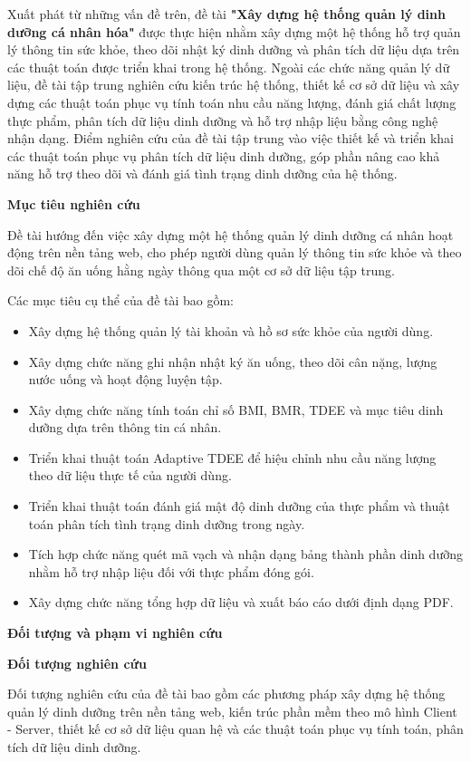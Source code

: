 \documentclass[12pt, a4paper]{report}
\begin{document}
Xuất phát từ những vấn đề trên, đề tài \textbf{"Xây dựng hệ thống quản lý dinh dưỡng cá nhân hóa"} được thực hiện nhằm xây dựng một hệ thống hỗ trợ quản lý thông tin sức khỏe, theo dõi nhật ký dinh dưỡng và phân tích dữ liệu dựa trên các thuật toán được triển khai trong hệ thống. Ngoài các chức năng quản lý dữ liệu, đề tài tập trung nghiên cứu kiến trúc hệ thống, thiết kế cơ sở dữ liệu và xây dựng các thuật toán phục vụ tính toán nhu cầu năng lượng, đánh giá chất lượng thực phẩm, phân tích dữ liệu dinh dưỡng và hỗ trợ nhập liệu bằng công nghệ nhận dạng. Điểm nghiên cứu của đề tài tập trung vào việc thiết kế và triển khai các thuật toán phục vụ phân tích dữ liệu dinh dưỡng, góp phần nâng cao khả năng hỗ trợ theo dõi và đánh giá tình trạng dinh dưỡng của hệ thống.

\textbf{Mục tiêu nghiên cứu}

Đề tài hướng đến việc xây dựng một hệ thống quản lý dinh dưỡng cá nhân hoạt động trên nền tảng web, cho phép người dùng quản lý thông tin sức khỏe và theo dõi chế độ ăn uống hằng ngày thông qua một cơ sở dữ liệu tập trung.

Các mục tiêu cụ thể của đề tài bao gồm:

\begin{itemize}
\item Xây dựng hệ thống quản lý tài khoản và hồ sơ sức khỏe của người dùng.
\item Xây dựng chức năng ghi nhận nhật ký ăn uống, theo dõi cân nặng, lượng nước uống và hoạt động luyện tập.
\item Xây dựng chức năng tính toán chỉ số BMI, BMR, TDEE và mục tiêu dinh dưỡng dựa trên thông tin cá nhân.
\item Triển khai thuật toán Adaptive TDEE để hiệu chỉnh nhu cầu năng lượng theo dữ liệu thực tế của người dùng.
\item Triển khai thuật toán đánh giá mật độ dinh dưỡng của thực phẩm và thuật toán phân tích tình trạng dinh dưỡng trong ngày.
\item Tích hợp chức năng quét mã vạch và nhận dạng bảng thành phần dinh dưỡng nhằm hỗ trợ nhập liệu đối với thực phẩm đóng gói.
\item Xây dựng chức năng tổng hợp dữ liệu và xuất báo cáo dưới định dạng PDF.
\end{itemize}
\textbf{Đối tượng và phạm vi nghiên cứu}

\textbf{Đối tượng nghiên cứu}

Đối tượng nghiên cứu của đề tài bao gồm các phương pháp xây dựng hệ thống quản lý dinh dưỡng trên nền tảng web, kiến trúc phần mềm theo mô hình Client - Server, thiết kế cơ sở dữ liệu quan hệ và các thuật toán phục vụ tính toán, phân tích dữ liệu dinh dưỡng.
\end{document}
